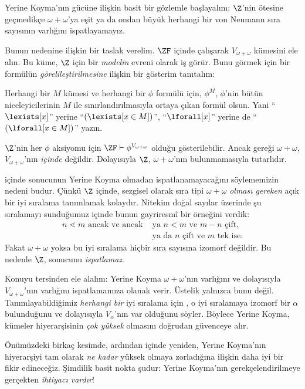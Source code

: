 \documentclass[../../../include/open-logic-section]{subfiles}
\begin{document}

Yerine Koyma'nın gücüne ilişkin basit bir gözlemle başlayalım: $\Z$'nin
ötesine geçmedikçe $\omega + \omega$'ya eşit ya da ondan büyük herhangi bir
von Neumann sıra sayısının varlığını ispatlayamayız.

Bunun nedenine ilişkin bir taslak verelim. $\ZF$ içinde çalışarak
$V_{\omega+\omega}$ kümesini ele alın. Bu küme, $\Z$ için bir \emph{modelin}
evreni olarak iş görür. Bunu görmek için bir formülün
\emph{görelileştirilmesine} ilişkin bir gösterim tanıtalım:
\begin{defn}
	Herhangi bir $M$ kümesi ve herhangi bir $\phi$ formülü için, $\phi^M$,
	$\phi$'nin bütün niceleyicilerinin $M$ ile sınırlandırılmasıyla ortaya
	çıkan formül olsun. Yani ``$\lexists[x]$'' yerine
	``$(\lexists[x \in M])$'', ``$\lforall[x]$'' yerine de
	``$(\lforall[x \in M])$'' yazın.
\end{defn}\noindent
$\Z$'nin her $\phi$ aksiyomu için $\ZF \vdash
\phi^{V_{\omega+\omega}}$ olduğu gösterilebilir. Ancak
 gereği $\omega+\omega$,
$V_{\omega+\omega}$'nın \emph{içinde} değildir. Dolayısıyla $\Z$,
$\omega+\omega$'nın bulunmamasıyla tutarlıdır.

 içinde
 sonucunun Yerine Koyma
olmadan ispatlanamayacağını söylememizin nedeni budur. Çünkü $\Z$ içinde,
sezgisel olarak sıra tipi $\omega+\omega$ \emph{olması gereken} açık bir iyi
sıralama tanımlamak kolaydır. Nitekim doğal sayılar üzerinde şu sıralamayı
sunduğumuz  içinde bunun gayriresmî bir örneğini
verdik:
\begin{align*}
	n \lessdot m \text{ ancak ve ancak }&\text{ya }n < m\text{ ve }m-n\text{ çift,}\\
	& \text{ya da $n$ çift ve $m$ tek ise.}
\end{align*}
Fakat $\omega+\omega$ yoksa bu iyi sıralama hiçbir sıra sayısına izomorf
değildir. Bu nedenle $\Z$, 
sonucunu \emph{ispatlamaz}.

Konuyu tersinden ele alalım: Yerine Koyma $\omega+\omega$'nın varlığını ve
dolayısıyla $V_{\omega+\omega}$'nın varlığını ispatlamamıza olanak verir.
Üstelik yalnızca bunu değil. Tanımlayabildiğimiz \emph{herhangi bir} iyi
sıralama için , o iyi
sıralamaya izomorf bir $\alpha$ bulunduğunu ve dolayısıyla $V_\alpha$'nın
var olduğunu söyler. Böylece Yerine Koyma, kümeler hiyerarşisinin
\emph{çok yüksek} olmasını doğrudan güvenceye alır.

Önümüzdeki birkaç kesimde, ardından
 içinde yeniden, Yerine Koyma'nın
hiyerarşiyi tam olarak \emph{ne kadar} yüksek olmaya zorladığına ilişkin daha
iyi bir fikir edineceğiz. Şimdilik basit nokta şudur: Yerine Koyma'nın
gerekçelendirilmeye gerçekten \emph{ihtiyacı vardır}!
\end{document}

